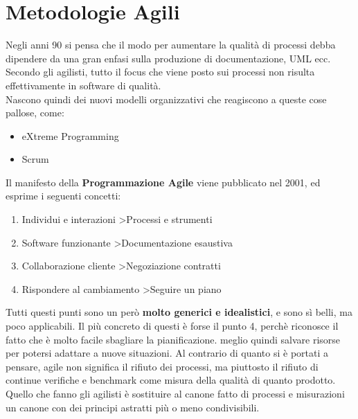\documentclass[a4paper,12pt]{article}
\begin{document}
\section{Metodologie Agili}
Negli anni 90 si pensa che il modo per aumentare la qualità di processi debba dipendere da una gran enfasi sulla produzione di documentazione, UML ecc. Secondo gli agilisti, tutto il focus che viene posto sui processi non risulta effettivamente in software di qualità.\\ Nascono quindi dei nuovi modelli organizzativi che reagiscono a queste cose pallose, come:
\begin{itemize}
\item eXtreme Programming
\item Scrum
\end{itemize}
Il manifesto della \textbf{Programmazione Agile} viene pubblicato nel 2001, ed esprime i seguenti concetti:
\begin{enumerate}
\item Individui e interazioni \textgreater\space Processi e strumenti
\item Software funzionante \textgreater\space Documentazione esaustiva
\item Collaborazione cliente \textgreater\space Negoziazione contratti
\item Rispondere al cambiamento \textgreater\space Seguire un piano
\end{enumerate}
Tutti questi punti sono un però \textbf{molto generici e idealistici}, e sono sì belli, ma poco applicabili. Il più concreto di questi è forse il punto 4, perchè riconosce il fatto che è molto facile sbagliare la pianificazione. \E meglio quindi salvare risorse per potersi adattare a nuove situazioni.
\vspace{0.5cm}
\noindent Al contrario di quanto si è portati a pensare, agile non significa il rifiuto dei processi, ma piuttosto il rifiuto di continue verifiche e benchmark come misura della qualità di quanto prodotto. Quello che fanno gli agilisti è sostituire al canone fatto di processi e misurazioni un canone con dei principi astratti più o meno condivisibili.
\end{document}

